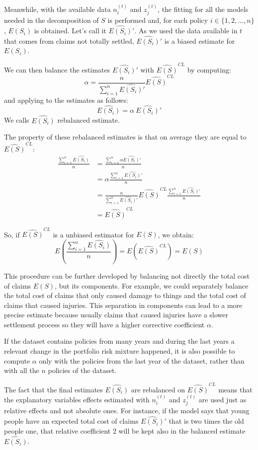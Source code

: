 \documentclass[a4paper, twoside, openright, 12pt]{report}
\theoremstyle{definition}
\theoremstyle{definition}
\theoremstyle{definition}
\theoremstyle{remark}
\begin{document}
Meanwhile, with the available data \(n_i^{(t)}\) and \(z_j^{(t)}\), the fitting for all the models needed in the decomposition of \(S\) is performed and, for each policy \(i\in\{1, 2, \dots, n\}\), \(E(S_i)\) is obtained. Let's call it \(\widehat{E(S_i)}'\). As we used the data available in \(t\) that comes from claims not totally settled, \(\widehat{E(S_i)}'\) is a biased estimate for \(E(S_i)\).

We can then balance the estimates \(\widehat{E(S_i)}'\) with \(\widehat{E(S)}^{CL}\) by computing:
\[
\alpha = \frac{n}{\sum_{i=1}^{n}{\widehat{E(S_i)}'}} \widehat{E(S)}^{CL}
\]
and applying to the estimates as follows:
\[
\widehat{E(S_i)} = \alpha \ \widehat{E(S_i)}'
\]
We calls \(\widehat{E(S_i)}\) rebalanced estimate.

The property of these rebalanced estimates is that on average they are equal to \(\widehat{E(S)}^{CL}\):
\begin{align*}
\frac{\sum_{i=1}^{n}{\widehat{E(S_i)}}}{n} & = \frac{\sum_{i=1}^{n}{\alpha\widehat{E(S_i)}'}}{n} \\
& = \alpha\frac{\sum_{i=1}^{n}{\widehat{E(S_i)}'}}{n} \\
& = \frac{n}{\sum_{i=1}^{n}{\widehat{E(S_i)}'}} \widehat{E(S)}^{CL} \frac{\sum_{i=1}^{n}{\widehat{E(S_i)}'}}{n} \\
& = \widehat{E(S)}^{CL}
\end{align*}

So, if \(\widehat{E(S)}^{CL}\) is a unbiased estimator for \(E(S)\), we obtain:
\[
E\left( \frac{\sum_{i=1}^{n}{\widehat{E(S_i)}}}{n} \right)
= E\left( \widehat{E(S)}^{CL} \right)
= E(S)
\]

This procedure can be further developed by balancing not directly the total cost of claims \(E(S)\), but its components. For example, we could separately balance the total cost of claims that only caused damage to things and the total cost of claims that caused injuries. This separation in components can lead to a more precise estimate because usually claims that caused injuries have a slower settlement process so they will have a higher corrective coefficient \(\alpha\).

If the dataset contains policies from many years and during the last years a relevant change in the portfolio risk mixture happened, it is also possible to compute \(\alpha\) only with the policies from the last year of the dataset, rather than with all the \(n\) policies of the dataset.

The fact that the final estimates \(\widehat{E(S_i)}\) are rebalanced on \(\widehat{E(S)}^{CL}\) means that the explanatory variables effects estimated with \(n_i^{(t)}\) and \(z_j^{(t)}\) are used just as relative effects and not absolute ones. For instance, if the model says that young people have an expected total cost of claims \(\widehat{E(S_i)}'\) that is two times the old people one, that relative coefficient 2 will be kept also in the balanced estimate \(\widehat{E(S_i)}\).
\end{document}
